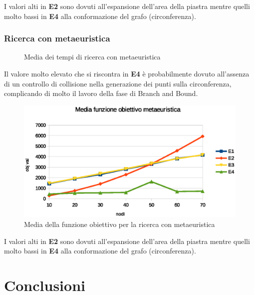 \documentclass[12pt,a4paper]{article}
\begin{document}
                I valori alti in \textbf{E2} sono dovuti all'espansione dell'area della piastra mentre quelli molto bassi in \textbf{E4} alla
                conformazione del grafo (circonferenza).

            \subsubsection{Ricerca con metaeuristica}

                    \begin{figure}[htb]
                        \centering
                        \caption{Media dei tempi di ricerca con metaeuristica}
                    \end{figure}

                    Il valore molto elevato che si riscontra in \textbf{E4} \`e probabilmente dovuto all'assenza di un controllo di collisione
                    nella generazione dei punti sulla circonferenza, complicando di molto il lavoro della fase di Branch and Bound.

                    \begin{figure}[htb]
                        \centering
                        \includegraphics[scale=0.8]{img/gavgobj}
                        \caption{Media della funzione obiettivo per la ricerca con metaeuristica}
                    \end{figure}

                    I valori alti in \textbf{E2} sono dovuti all'espansione dell'area della piastra mentre quelli molto bassi in \textbf{E4} alla
                    conformazione del grafo (circonferenza).


    \section{Conclusioni}
\end{document}
